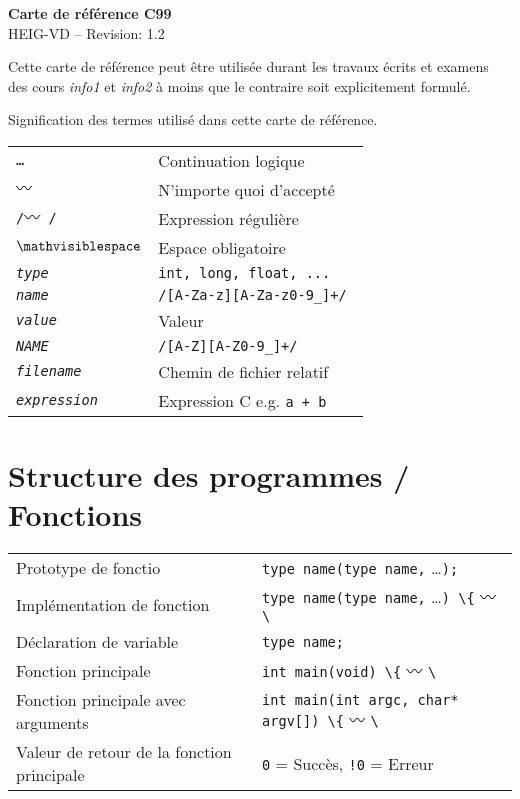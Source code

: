 \documentclass{article}
\newcommand{\type}{\emph{type}}
\newcommand{\name}{\emph{name}}
\newcommand{\val}{\emph{value}}
\newcommand{\NAME}{\emph{NAME}}
\newcommand{\file}{\emph{filename}}
\newcommand{\expr}{\emph{expression}}
\newcommand{\etc}{\small \ldots}
\newcommand{\any}{$\hzigzag$ }
\newcommand{\spc}{$\mathvisiblespace$}
\newcommand{\cd}{\lstinline}
\begin{document}
\setlength{\columnseprule}{0.4pt}

\begin{multicols*}{3}
\begin{center}
{\Large \bf Carte de référence C99}\\
HEIG-VD -- $ $Revision: 1.2 $ $\\
\huge{\cc\ccby\ccsa}
\end{center}

Cette carte de référence peut être utilisée durant les travaux écrits et examens des cours \emph{info1} et \emph{info2} à moins que le contraire soit explicitement formulé.

Signification des termes utilisé dans cette carte de référence.

\begin{tabularx}{\linewidth}{lX}
  \tt \etc                          & Continuation logique \\
  \tt \any                          & N'importe quoi d'accepté \\
  \tt /\any/                        & Expression régulière \\
  \tt \spc                          & Espace obligatoire \\
  \tt \type                         & \tt int, long, float, ... \\
  \tt \name                         & \tt /[A-Za-z][A-Za-z0-9\_]+/ \\
  \tt \val                          & Valeur \\
  \tt \NAME                         & \tt /[A-Z][A-Z0-9\_]+/ \\
  \tt \file                         & Chemin de fichier relatif \\
  \tt \expr                         & Expression C e.g. \tt a + b \\
\end{tabularx}

\section*{Structure des programmes / Fonctions}

  \begin{tabularx}{\linewidth}{lX}
    Prototype de fonctio               & \cd{type name(type name,} \etc \cd{);} \\
    Implémentation de fonction         & \cd{type name(type name,} \etc \cd{) \{} \any \cd{\}} \\
    Déclaration de variable            & \cd{type name;} \\
    Fonction principale                & \cd{int main(void) \{} \any \cd{\}} \\
    Fonction principale avec arguments & \cd{int main(int argc, char* argv[]) \{} \any \cd{\}} \\
    Valeur de retour de la fonction principale & \cd{0} = Succès, \cd{!0} = Erreur \\
  \end{tabularx}


\end{multicols*}
\end{document}
